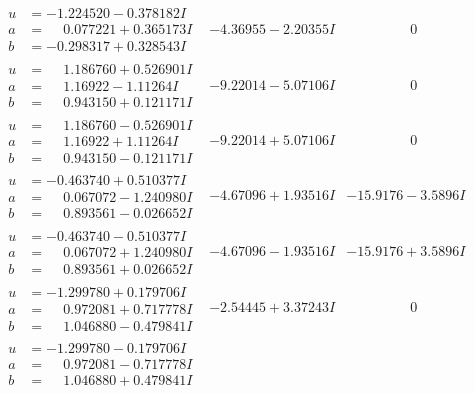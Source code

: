 \documentclass[1p]{elsarticle_modified}
\theoremstyle{definition}
\begin{document}
$$\begin{array}{c|c|c}
\begin{aligned}
u &= -1.224520 - 0.378182 I \\
a &= \phantom{-}0.077221 + 0.365173 I \\
b &= -0.298317 + 0.328543 I\end{aligned}
 & -4.36955 - 2.20355 I & \phantom{-0.000000 } 0 \\ \hline\begin{aligned}
u &= \phantom{-}1.186760 + 0.526901 I \\
a &= \phantom{-}1.16922 - 1.11264 I \\
b &= \phantom{-}0.943150 + 0.121171 I\end{aligned}
 & -9.22014 - 5.07106 I & \phantom{-0.000000 } 0 \\ \hline\begin{aligned}
u &= \phantom{-}1.186760 - 0.526901 I \\
a &= \phantom{-}1.16922 + 1.11264 I \\
b &= \phantom{-}0.943150 - 0.121171 I\end{aligned}
 & -9.22014 + 5.07106 I & \phantom{-0.000000 } 0 \\ \hline\begin{aligned}
u &= -0.463740 + 0.510377 I \\
a &= \phantom{-}0.067072 - 1.240980 I \\
b &= \phantom{-}0.893561 - 0.026652 I\end{aligned}
 & -4.67096 + 1.93516 I & -15.9176 - 3.5896 I \\ \hline\begin{aligned}
u &= -0.463740 - 0.510377 I \\
a &= \phantom{-}0.067072 + 1.240980 I \\
b &= \phantom{-}0.893561 + 0.026652 I\end{aligned}
 & -4.67096 - 1.93516 I & -15.9176 + 3.5896 I \\ \hline\begin{aligned}
u &= -1.299780 + 0.179706 I \\
a &= \phantom{-}0.972081 + 0.717778 I \\
b &= \phantom{-}1.046880 - 0.479841 I\end{aligned}
 & -2.54445 + 3.37243 I & \phantom{-0.000000 } 0 \\ \hline\begin{aligned}
u &= -1.299780 - 0.179706 I \\
a &= \phantom{-}0.972081 - 0.717778 I \\
b &= \phantom{-}1.046880 + 0.479841 I\end{aligned}

\end{array}$$
\end{document}
